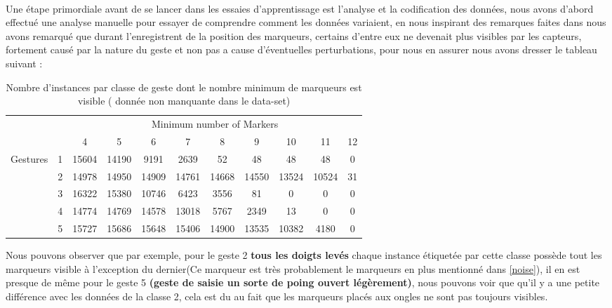 \paragraph{}
Une étape primordiale avant de se lancer dans les essaies d'apprentissage est l'analyse et la codification des données, nous avons d'abord effectué une analyse manuelle pour essayer de comprendre comment les données variaient, en nous inspirant des remarques faites dans \cite{datasetDetails} nous avons remarqué que durant l'enregistrent de la position des marqueurs, certains d'entre eux ne devenait plus visibles par les capteurs, fortement causé par la nature du geste et non pas a cause d'éventuelles perturbations, pour nous en assurer nous avons dresser le tableau suivant : 
\begin{table}[H]
	\centering
	\begin{tabular}{cc|c|c|c|c|c|c|c|c|c|}
		\cline{3-11}
		&           & \multicolumn{9}{c|}{Minimum number of Markers}                     \\ \cline{3-11} 
		& \textbf{}     & 4     & 5     & 6     & 7     & 8     & 9     & 10    & 11 & 12\\ \hline
		\multicolumn{1}{|c|}{\multirow{5}{*}{Gestures}} & 1         & 15604 & 14190 & 9191  & 2639  & 52    & 48    & 48    & 48    & 0  \\ \cline{2-11} 
		\multicolumn{1}{|c|}{}                          & 2         & 14978 & 14950 & 14909 & 14761 & 14668 & 14550 & 13524 & 10524 & 31 \\ \cline{2-11} 
		\multicolumn{1}{|c|}{}                          & 3         & 16322 & 15380 & 10746 & 6423  & 3556  & 81    & 0     & 0     & 0  \\ \cline{2-11} 
		\multicolumn{1}{|c|}{}                          & 4         & 14774 & 14769 & 14578 & 13018 & 5767  & 2349  & 13    & 0     & 0  \\ \cline{2-11} 
		\multicolumn{1}{|c|}{}                          & 5         & 15727 & 15686 & 15648 & 15406 & 14900 & 13535 & 10382 & 4180  & 0  \\ \hline
	\end{tabular}
	\caption{Nombre d'instances par classe de geste dont le nombre minimum de marqueurs est visible ( donnée non manquante dans le data-set)}
	\label{my-label}
\end{table}
\par 
Nous pouvons observer que par exemple, pour le geste 2 \textbf{tous les doigts levés} chaque instance étiquetée par cette classe possède tout les marqueurs visible à l'exception du dernier(Ce marqueur est très probablement le marqueurs en plus mentionné dans \ref{noise}), il en est presque de même pour le geste 5 \textbf{(geste de saisie un sorte de poing ouvert légèrement)}, nous pouvons voir que qu'il y a une petite différence avec les données de la classe 2, cela est du au fait que les marqueurs placés aux ongles ne sont pas toujours visibles.\par 
